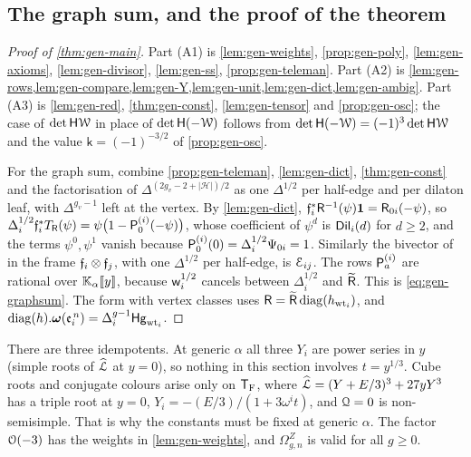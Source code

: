 \subsection{The graph sum, and the proof of the theorem}

\begin{proof}[Proof of \cref{thm:gen-main}]
Part (A1) is \cref{lem:gen-weights}, \cref{prop:gen-poly}, \cref{lem:gen-axioms}, \cref{lem:gen-divisor}, \cref{lem:gen-ss}, \cref{prop:gen-teleman}. Part (A2) is \cref{lem:gen-rows,lem:gen-compare,lem:gen-Y,lem:gen-unit,lem:gen-dict,lem:gen-ambig}. Part (A3) is \cref{lem:gen-red}, \cref{thm:gen-const}, \cref{lem:gen-tensor} and \cref{prop:gen-osc}; the case of $\det\mathsf{H}\mathcal{W}$ in place of $\det\mathsf{H}(-\mathcal{W})$ follows from $\det\mathsf{H}(-\mathcal{W})=(-1)^3\det\mathsf{H}\mathcal{W}$ and the value $\mathsf{k}=(-1)^{-3/2}$ of \cref{prop:gen-osc}.

For the graph sum, combine \cref{prop:gen-teleman}, \cref{lem:gen-dict}, \cref{thm:gen-const} and the factorisation of $\Delta^{(2g_v-2+|\mathcal{H}|)/2}$ as one $\Delta^{1/2}$ per half-edge and per dilaton leaf, with $\Delta^{g_v-1}$ left at the vertex. By \cref{lem:gen-dict}, $\mathfrak{f}_i^*\mathsf{R}^{-1}(\psi)\mathbf{1}=\mathsf{R}_{0i}(-\psi)$, so $\Delta_i^{1/2}\mathfrak{f}_i^*T_{\mathsf{R}}(\psi)=\psi\big(1-\mathsf{P}_0^{(i)}(-\psi)\big)$, whose coefficient of $\psi^d$ is $\mathsf{Dil}_i(d)$ for $d\geq2$, and the terms $\psi^0,\psi^1$ vanish because $\mathsf{P}_0^{(i)}(0)=\Delta_i^{1/2}\Psi_{0i}=1$. Similarly the bivector of \cite[Def.~2.2]{PPZ15} in the frame $\mathfrak{f}_i\otimes\mathfrak{f}_j$, with one $\Delta^{1/2}$ per half-edge, is $\mathcal{E}_{ij}$. The rows $\mathsf{P}_a^{(i)}$ are rational over $\mathbb{K}_{\alpha}[\![ y ]\!]$, because $\mathsf{w}_i^{1/2}$ cancels between $\Delta_i^{1/2}$ and $\widetilde{\mathsf{R}}$. This is \cref{eq:gen-graphsum}. The form with vertex classes uses $\mathsf{R}=\widetilde{\mathsf{R}}\,\mathrm{diag}(h_{\mathrm{wt}_i})$, \cite[Prop.~2.14]{PPZ15} and $\mathrm{diag}(h).\boldsymbol{\omega}(\mathfrak{e}_i^{\,n})=\Delta_i^{g-1}\mathsf{Hg}_{\mathrm{wt}_i}$.
\end{proof}

\begin{rmk}
\label{rmk:gen-rank3}
There are three idempotents. At generic $\alpha$ all three $Y_i$ are power series in $y$ (simple roots of $\widehat{\mathcal{L}}$ at $y=0$), so nothing in this section involves $t=y^{1/3}$. Cube roots and conjugate colours arise only on $\mathsf{T}_{\mathrm{F}}$, where $\widehat{\mathcal{L}}=(Y+E/3)^3+27yY^3$ has a triple root at $y=0$, $Y_i=-(E/3)/(1+3\omega^it)$, and $\mathcal{Q}=0$ is non-semisimple. That is why the constants must be fixed at generic $\alpha$. The factor $\mathcal{O}(-3)$ has the weights in \cref{lem:gen-weights}, and $\Omega^{Z}_{g,n}$ is valid for all $g\geq0$.
\end{rmk}
